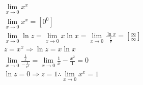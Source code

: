 \begin{ex}
\begin{align}
&\lim_{x\rightarrow 0} x^{x}\nonumber\\
&\lim_{x\rightarrow 0} x^{x}=[0^0]\nonumber\\
&\lim_{x\rightarrow 0} \ln{z}=\lim_{x\rightarrow 0} x\ln{x}=\lim_{x\rightarrow 0} \frac{\ln{x}}{\frac{1}{x}}=\left[\frac{\infty}{\infty}\right]\nonumber\\
&z=x^{x} \Rightarrow \ln{z}=x\ln{x}\nonumber\\
&\lim_{x\rightarrow 0} \frac{\frac{1}{x}}{-\frac{1}{x^2}}=\lim_{x\rightarrow 0} \frac{1}{x}-\frac{x^2}{1}=0\nonumber\\
&\ln{z}=0 \Rightarrow z=1 \therefore \lim_{x\rightarrow 0} x^{x}=1\nonumber
\end{align}
\end{ex}
